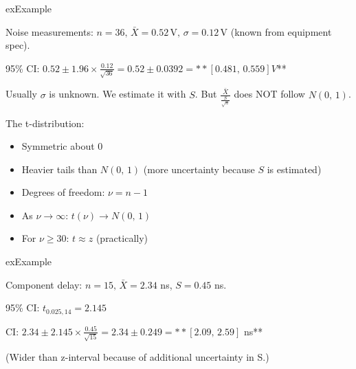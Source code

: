 \begin{PSbox}[unbreakable]{ex}{Example}

Noise measurements: $n = 36,\, \bar{X} = 0.52\,\mathrm{V},\, \sigma = 0.12\,\mathrm{V}$ (known from equipment spec).

95\% CI: $0.52 \pm 1.96 \times \frac{0.12}{\sqrt{36}} = 0.52 \pm 0.0392 = \ast \ast [0.481,\, 0.559] V$**

\end{PSbox}



Usually $\sigma$ is unknown. We estimate it with $S$. But $\frac{\bar{X}}{\frac{S}{\sqrt{n}}}$ does NOT follow $N(0,\,1)$.



The t-distribution:

\begin{itemize}
\tightlist
\item
  Symmetric about 0
\item
  Heavier tails than $N(0,\,1)$ (more uncertainty because $S$ is estimated)
\item
  Degrees of freedom: $\nu = n - 1$
\item
  As $\nu \to \infty$: $t(\nu) \to N(0,\,1)$
\item
  For $\nu \ge 30$: $t \approx z$ (practically)
\end{itemize}



\begin{PSbox}[unbreakable]{ex}{Example}

Component delay: $n = 15,\, \bar{X} = 2.34$ ns, $S = 0.45$ ns.

95\% CI: $t_{0.025, 14} = 2.145$

CI: $2.34 \pm 2.145 \times \frac{0.45}{\sqrt{15}} = 2.34 \pm 0.249 = \ast \ast [2.09,\, 2.59]$ ns**

(Wider than z-interval because of additional uncertainty in S.)

\end{PSbox}


